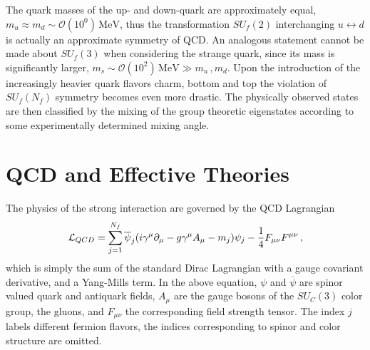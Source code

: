 The quark masses of the up- and down-quark are approximately equal, ${m_u\approx m_d\sim\mathcal{O}(10^0)\,\mathrm{MeV}}$, thus the transformation $SU_f(2)$ interchanging ${u\leftrightarrow d}$ is actually an approximate symmetry of QCD. An analogous statement cannot be made about $SU_f(3)$ when considering the strange quark, since its mass is significantly larger, ${m_s\sim\mathcal{O}(10^2)\,\mathrm{MeV}\gg m_u\,,m_d}$. Upon the introduction of the increasingly heavier quark flavors charm, bottom and top the violation of ${SU_f(N_f)}$ symmetry becomes even more drastic. The physically observed states are then classified by the mixing of the group theoretic eigenstates according to some experimentally determined mixing angle.


\section{QCD and Effective Theories}

The physics of the strong interaction are governed by the QCD Lagrangian \cite{Navasothers_2024}
\begin{equation}
    \mathcal{L}_{QCD}=\sum_{j=1}^{N_f}\overline{\psi}_j({i}\gamma^\mu\partial_\mu-g\gamma^\mu A_\mu-m_j)\psi_j-\frac{1}{4}F_{\mu\nu}F^{\mu\nu}\,,
    \label{eq:LagrangiansQCD}
\end{equation}
which is simply the sum of the standard Dirac Lagrangian with a gauge covariant derivative, and a Yang-Mills term. In the above equation, $\psi$ and $\overline{\psi}$ are spinor valued quark and antiquark fields, $A_\mu$ are the gauge bosons of the $SU_C(3)$ color group, the gluons, and $F_{\mu\nu}$ the corresponding field strength tensor. The index $j$ labels different fermion flavors, the indices corresponding to spinor and color structure are omitted.

